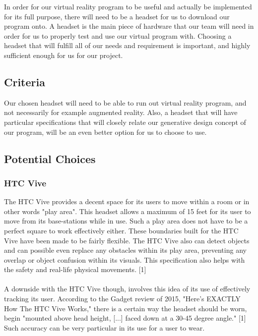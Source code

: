 \documentclass[letterpaper,10pt,onecolumn,compsoc]{IEEEtran}
\begin{document}
\noindent
In order for our virtual reality program to be useful and actually be implemented for its full purpose, there will need to be a headset for us to download our program onto. A headset is the main piece of hardware that our team will need in order for us to properly test and use our virtual program with. Choosing a headset that will fulfill all of our needs and requirement is important, and highly sufficient enough for us for our project.

\subsection{Criteria}

\noindent
Our chosen headset will need to be able to run out virtual reality program, and not necessarily for example augmented reality. Also, a headset that will have particular specifications that will closely relate our generative design concept of our program, will be an even better option for us to choose to use.


\subsection{Potential Choices}
\subsubsection{HTC Vive}


\noindent
The HTC Vive provides a decent space for its users to move within a room or in other words "play area". This headset allows a maximum of 15 feet for its user to move from its base-stations while in use. Such a play area does not have to be a perfect square to work effectively either. These boundaries built for the HTC Vive have been made to be fairly flexible. The HTC Vive also can detect objects and can possible even replace any obstacles within its play area, preventing any overlap or object confusion within its visuals. This specification also helps with the safety and real-life physical movements. [1] 
\\ ~ \\
A downside with the HTC Vive though, involves this idea of its use of effectively tracking its user. According to the Gadget review of 2015, "Here's EXACTLY How The HTC Vive Works," there is a certain way the headset should be worn, begin "mounted above head height, [...] faced down at a 30-45 degree angle." [1] Such accuracy can be very particular in its use for a user to wear.
\end{document}
